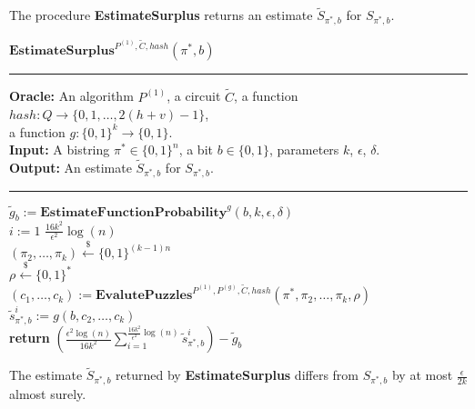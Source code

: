 The procedure \textbf{EstimateSurplus} returns an estimate $\widetilde{S}_{\pi^*, b}$ for $S_{\pi^*, b}$.
%
\begin{codeblock}
  $\textbf{EstimateSurplus}^{P^{(1)}, \widetilde{C}, hash}(\pi^*, b)$
  \medskip
  \hrule
  \medskip
  \textbf{Oracle:} An algorithm $P^{(1)}$, a circuit $\widetilde{C}$, a function $hash : Q \rightarrow \{0,1,\dots, 2(h+v)-1\}$, \\
  \IndII a function $g: \{0,1\}^{k} \rightarrow \{0,1\}$.\\
  \textbf{Input:} A bistring $\pi^* \in \{0,1\}^{n}$, a bit $b \in \{0,1\}$, parameters $k$, $\epsilon$, $\delta$.\\
  \textbf{Output:} An estimate $\widetilde{S}_{\pi^*, b}$ for $S_{\pi^*, b}$.
  \medskip\hrule\medskip
  $\widetilde{g}_b := \textbf{EstimateFunctionProbability}^{g}(b, k, \epsilon, \delta)$ \\
  \For $i:=1$ \To $\frac{16k^2}{\epsilon^2}\log(n)$ \Do \\
  \IndI $(\pi_{2}, \dots, \pi_k) \xleftarrow{\$} \{0,1\}^{(k-1)n}$\\
  \IndI $\rho \xleftarrow{\$} \{0,1\}^{*}$\\
  \IndI $(c_1, \dots, c_k) := \textbf{EvalutePuzzles}^{P^{(1)}, P^{(g)}, \widetilde{C}, hash}(\pi^*, \pi_2, \dots, \pi_k, \rho)$\\
  \IndI $\widetilde{s}_{\pi^*,b}^i := g(b, c_{2}, \dots, c_k)$\\
  \textbf{return} $\left(\frac{\epsilon^2\log(n)}{16k^2} \sum_{i=1}^{\frac{16k^2}{\epsilon^2}\log(n)} \widetilde{s}_{\pi^*,b}^i \right) - \widetilde{g}_b$\\
\end{codeblock}
%
\begin{lemma}
  \label{lemma:surplus_estimate}
The estimate $\widetilde{S}_{\pi^*,b}$ returned by \textbf{EstimateSurplus} differs from $S_{\pi^*, b}$ by at most $\frac{\epsilon}{2k}$ almost surely.
\end{lemma}

